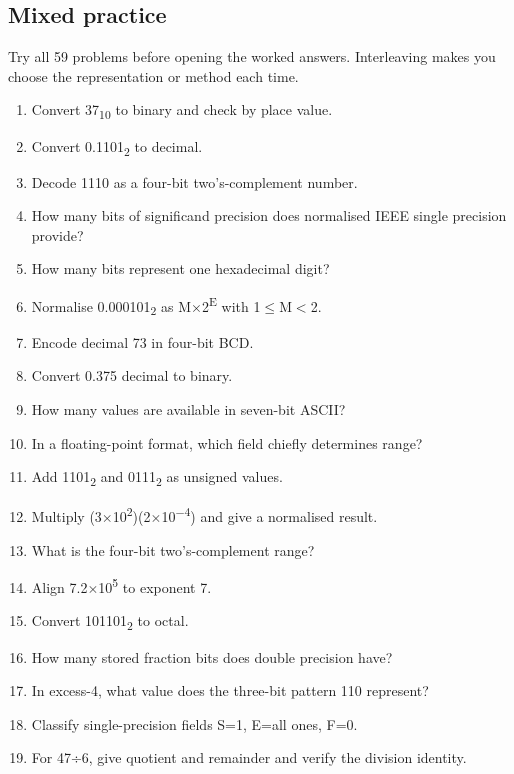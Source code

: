 \documentclass[11pt]{article}
\begin{document}
\clearpage

\begin{keepsection}
\section{Mixed practice}

Try all 59 problems before opening the worked answers. Interleaving makes you choose the representation or method each time.

\begin{enumerate}
\item Convert 37\textsubscript{10} to binary and check by place value.
\item Convert 0.1101\textsubscript{2} to decimal.
\item Decode 1110 as a four-bit two’s-complement number.
\item How many bits of significand precision does normalised IEEE single precision provide?
\item How many bits represent one hexadecimal digit?
\item Normalise 0.000101\textsubscript{2} as M\ensuremath{\times}2\textsuperscript{E} with 1\ensuremath{\leq}M\ensuremath{<}2.
\item Encode decimal 73 in four-bit BCD.
\item Convert 0.375 decimal to binary.
\item How many values are available in seven-bit ASCII?
\item In a floating-point format, which field chiefly determines range?
\item Add 1101\textsubscript{2} and 0111\textsubscript{2} as unsigned values.
\item Multiply (3\ensuremath{\times}10\textsuperscript{2})(2\ensuremath{\times}10\textsuperscript{\ensuremath{-}4}) and give a normalised result.
\item What is the four-bit two’s-complement range?
\item Align 7.2\ensuremath{\times}10\textsuperscript{5} to exponent 7.
\item Convert 101101\textsubscript{2} to octal.
\item How many stored fraction bits does double precision have?
\item In excess-4, what value does the three-bit pattern 110 represent?
\item Classify single-precision fields S=1, E=all ones, F=0.
\item For 47÷6, give quotient and remainder and verify the division identity.

\end{enumerate}
\end{keepsection}
\end{document}
